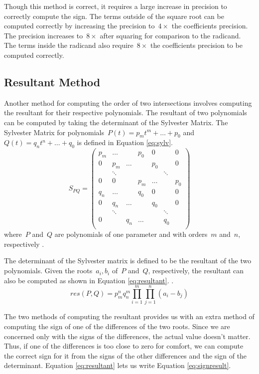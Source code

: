 \documentclass{cccg16}
\begin{document}
Though this method is correct, it requires a large increase in
precision to correctly compute the sign. The terms outside of the
square root can be computed correctly by increasing the precision
to~$4\times$ the coefficients precision.  The precision increases
to~$8\times$ after squaring for comparison to the radicand.  The terms
inside the radicand also require~$8\times$ the coefficients precision
to be computed correctly.

\subsection{Resultant Method}
Another method for computing the order of two intersections involves
computing the resultant for their respective polynomials.  The
resultant of two polynomials can be computed by taking the determinant
of the Sylvester Matrix.  The Sylvester Matrix for
polynomials~$P(t)=p_m t^m + \dots + p_0$ and~$Q(t)=q_n t^n + \dots +
q_0$ is defined in Equation \ref{eq:sylv}.
\begin{equation}
  S_{PQ}=\begin{pmatrix}
    p_m & \dots & & p_0 & 0 & & 0\\
    0 & p_m & \dots & & p_0 & & 0\\
    & \ddots & & & & \ddots\\
    0 & 0 & & p_m & \dots & & p_0\\
    q_n & \dots & & q_0 & 0 & & 0\\
    0 & q_n & \dots & & q_0 & & 0\\
    & \ddots & & & & \ddots\\
    0 & & q_n & \dots & & q_0\\
  \end{pmatrix}
  \label{eq:sylv}
\end{equation}
where~$P$ and~$Q$ are polynomials of one parameter and with orders~$m$
and~$n$, respectively \cite[Section~3.5]{cheeyap}.

The determinant of the Sylvester matrix is defined to be the resultant
of the two polynomials.  Given the roots~$a_i, b_i$ of~$P$ and~$Q$,
respectively, the resultant can also be computed as shown in Equation
\ref{eq:resultant}. \cite[Section~6.4]{cheeyap}.
\begin{equation}
  res(P, Q)=p_m^n q_n^m \prod_{i=1}^m\prod_{j=1}^n (a_i-b_j)
  \label{eq:resultant}
\end{equation}

The two methods of computing the resultant provides us with an extra
method of computing the sign of one of the differences of the two
roots.  Since we are concerned only with the signs of the differences,
the actual value doesn't matter.  Thus, if one of the differences is
too close to zero for comfort, we can compute the correct sign for it
from the signs of the other differences and the sign of the
determinant.  Equation \ref{eq:resultant} lets us write Equation
\ref{eq:signresult}.
\end{document}
